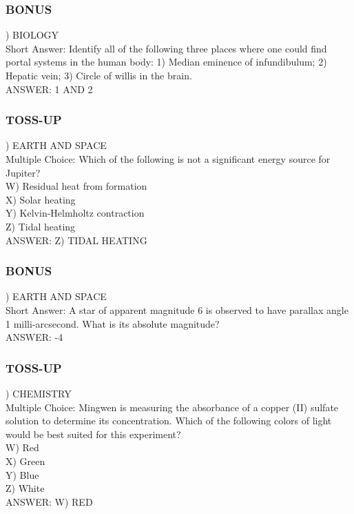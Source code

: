 \documentclass{article}
\begin{document}
\subsubsection*{BONUS}
) BIOLOGY \\
Short Answer: Identify all of the following three places where one could find portal systems in the human body: 1) Median eminence of infundibulum; 2) Hepatic vein; 3) Circle of willis in the brain. \\
ANSWER: 1 AND 2

\newpage

\subsubsection*{TOSS-UP}
) EARTH AND SPACE \\
Multiple Choice: Which of the following is not a significant energy source for Jupiter? \\
W) Residual heat from formation \\
X) Solar heating \\
Y) Kelvin-Helmholtz contraction \\
Z) Tidal heating \\
ANSWER: Z) TIDAL HEATING

\subsubsection*{BONUS}
) EARTH AND SPACE \\
Short Answer: A star of apparent magnitude 6 is observed to have parallax angle 1 milli-arcsecond. What is its absolute magnitude? \\
ANSWER: -4

\newpage

\subsubsection*{TOSS-UP}
) CHEMISTRY \\
Multiple Choice: Mingwen is measuring the absorbance of a copper (II) sulfate solution to determine its concentration. Which of the following colors of light would be best suited for this experiment? \\
W) Red \\
X) Green \\
Y) Blue \\
Z) White \\
ANSWER: W) RED
\end{document}
